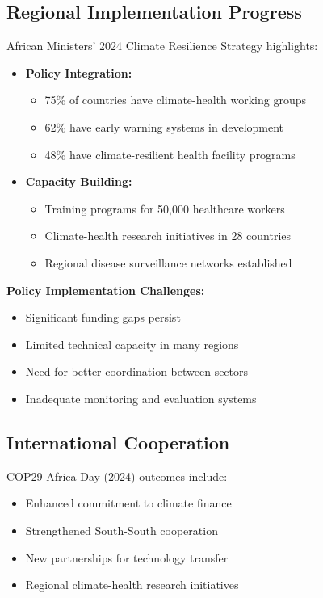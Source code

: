 \subsection{Regional Implementation Progress}
African Ministers' 2024 Climate Resilience Strategy highlights:

\begin{itemize}
    \item \textbf{Policy Integration:}
    \begin{itemize}
        \item 75\% of countries have climate-health working groups
        \item 62\% have early warning systems in development
        \item 48\% have climate-resilient health facility programs
    \end{itemize}
    
    \item \textbf{Capacity Building:}
    \begin{itemize}
        \item Training programs for 50,000 healthcare workers
        \item Climate-health research initiatives in 28 countries
        \item Regional disease surveillance networks established
    \end{itemize}
\end{itemize}

\begin{keymessage}
\textbf{Policy Implementation Challenges:}
\begin{itemize}
    \item Significant funding gaps persist
    \item Limited technical capacity in many regions
    \item Need for better coordination between sectors
    \item Inadequate monitoring and evaluation systems
\end{itemize}
\end{keymessage}

\subsection{International Cooperation}
COP29 Africa Day (2024) outcomes include:

\begin{itemize}
    \item Enhanced commitment to climate finance
    \item Strengthened South-South cooperation
    \item New partnerships for technology transfer
    \item Regional climate-health research initiatives
\end{itemize}

